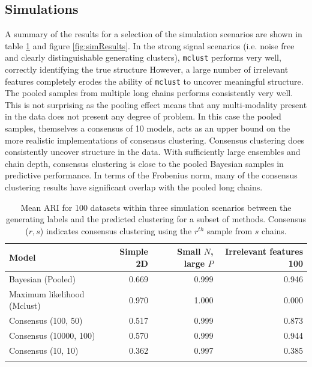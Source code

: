 \documentclass{bioinfo}
\begin{document}
\subsection{Simulations}
A summary of the results for a selection of the simulation scenarios are shown in table \ref{table:meanARISims} and figure \ref{fig:simResults}. In the strong signal scenarios (i.e. noise free and clearly distinguishable generating clusters), \texttt{mclust} performs very well, correctly identifying the true structure However, a large number of irrelevant features completely erodes the ability of \texttt{mclust} to uncover meaningful structure. The pooled samples from multiple long chains performs consistently very well. This is not surprising as the pooling effect means that any multi-modality present in the data does not present any degree of problem. In this case the pooled samples, themselves a consensus of 10 models, acts as an upper bound on the more realistic implementations of consensus clustering. Consensus clustering does consistently uncover structure in the data. With sufficiently large ensembles and chain depth, consensus clustering is close to the pooled Bayesian samples in predictive performance. In terms of the Frobenius norm, many of the consensus clustering results have significant overlap with the pooled long chains.

\begin{table}[ht]
	\centering
	\caption{Mean ARI for 100 datasets within three simulation scenarios between the generating labels and the predicted clustering for a subset of methods. Consensus ($r, s$) indicates consensus clustering using the $r^{th}$ sample from $s$ chains.}
	\begin{tabular}{l|rrr}
		\toprule
		\textbf{Model} & Simple 2D & Small $N$, large $P$ & Irrelevant features 100 \\
		\midrule
		Bayesian (Pooled) &  0.669 & 				0.999 &         0.946\\
		Maximum likelihood (Mclust) & 0.970 &       1.000 &         0.000\\
		Consensus (100, 50) & 0.517 &          		0.999 &			0.873\\
		Consensus (10000, 100) & 0.570 &            0.999 &			0.944\\
		Consensus (10, 10) & 0.362 &	            0.997 &         0.385\\
		\botrule
	\end{tabular}
	\label{table:meanARISims}
\end{table}
\end{document}
